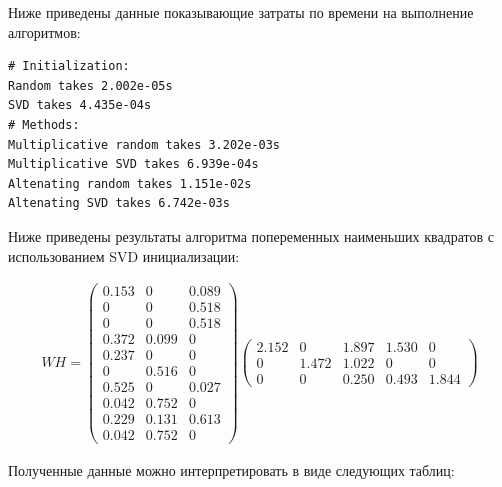 \newpage


Ниже приведены данные показывающие затраты по времени на выполнение алгоритмов:
\\

\begin{lstlisting}[caption=Затраты по времени на выполнение алгоритмов]
# Initialization:
Random takes 2.002e-05s
SVD takes 4.435e-04s
# Methods:
Multiplicative random takes 3.202e-03s
Multiplicative SVD takes 6.939e-04s
Altenating random takes 1.151e-02s
Altenating SVD takes 6.742e-03s
\end{lstlisting}

Ниже приведены результаты алгоритма попеременных наименьших квадратов с использованием SVD инициализации:

\begin{align*}
W H =
\begin{pmatrix}
     0.153  &   0  &   0.089 \\
     0  &   0  &   0.518 \\
     0  &   0  &   0.518 \\
     0.372  &   0.099  &   0 \\
     0.237  &   0  &   0 \\
     0  &   0.516  &   0 \\
     0.525  &  	0  &   0.027 \\
     0.042  &   0.752  &   0 \\
     0.229  &   0.131  &   0.613 \\
     0.042  &   0.752  &   0
\end{pmatrix}
\begin{pmatrix}
     2.152  &   0  &   1.897  &   1.530  &  0 \\
     0  &   1.472  &   1.022  &   0  &   0 \\
     0  &   0  &   0.250  &   0.493  &   1.844
\end{pmatrix}
\end{align*}



\newpage



Полученные данные можно интерпретировать в виде следующих таблиц:

